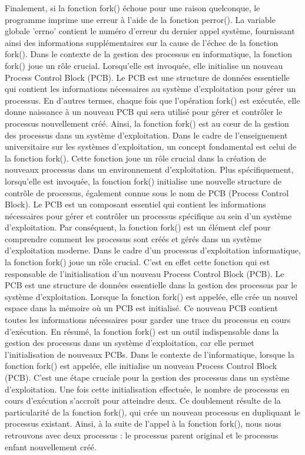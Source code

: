 \documentclass[12pt]{article}
\begin{document}
Finalement, si la fonction fork() échoue pour une raison quelconque, le programme imprime une erreur à l'aide de la fonction perror(). La variable globale 'errno' contient le numéro d'erreur du dernier appel système, fournissant ainsi des informations supplémentaires sur la cause de l'échec de la fonction fork().
Dans le contexte de la gestion des processus en informatique, la fonction fork() joue un rôle crucial. Lorsqu'elle est invoquée, elle initialise un nouveau Process Control Block (PCB). Le PCB est une structure de données essentielle qui contient les informations nécessaires au système d'exploitation pour gérer un processus. En d'autres termes, chaque fois que l'opération fork() est exécutée, elle donne naissance à un nouveau PCB qui sera utilisé pour gérer et contrôler le processus nouvellement créé. Ainsi, la fonction fork() est au cœur de la gestion des processus dans un système d'exploitation.
Dans le cadre de l'enseignement universitaire sur les systèmes d'exploitation, un concept fondamental est celui de la fonction fork(). Cette fonction joue un rôle crucial dans la création de nouveaux processus dans un environnement d'exploitation. Plus spécifiquement, lorsqu'elle est invoquée, la fonction fork() initialise une nouvelle structure de contrôle de processus, également connue sous le nom de PCB (Process Control Block). Le PCB est un composant essentiel qui contient les informations nécessaires pour gérer et contrôler un processus spécifique au sein d'un système d'exploitation. Par conséquent, la fonction fork() est un élément clef pour comprendre comment les processus sont créés et gérés dans un système d'exploitation moderne.
Dans le cadre d'un processus d'exploitation informatique, la fonction fork() joue un rôle crucial. C'est en effet cette fonction qui est responsable de l'initialisation d'un nouveau Process Control Block (PCB). Le PCB est une structure de données essentielle dans la gestion des processus par le système d'exploitation. Lorsque la fonction fork() est appelée, elle crée un nouvel espace dans la mémoire où un PCB est initialisé. Ce nouveau PCB contient toutes les informations nécessaires pour garder une trace du processus en cours d'exécution. En résumé, la fonction fork() est un outil indispensable dans la gestion des processus dans un système d'exploitation, car elle permet l'initialisation de nouveaux PCBs.
Dans le contexte de l'informatique, lorsque la fonction fork() est appelée, elle initialise un nouveau Process Control Block (PCB). C'est une étape cruciale pour la gestion des processus dans un système d'exploitation. Une fois cette initialisation effectuée, le nombre de processus en cours d'exécution s'accroît pour atteindre deux. Ce doublement résulte de la particularité de la fonction fork(), qui crée un nouveau processus en dupliquant le processus existant. Ainsi, à la suite de l'appel à la fonction fork(), nous nous retrouvons avec deux processus : le processus parent original et le processus enfant nouvellement créé.
\end{document}
